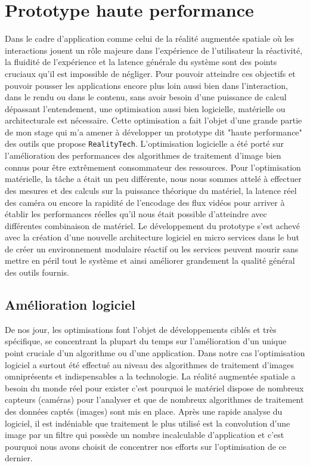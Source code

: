 \chapter{Prototype haute performance}
\label{chap:protoHP}

Dans le cadre d'application comme celui de la réalité augmentée spatiale où les interactions jouent un rôle majeure dans l'expérience de l'utilisateur la réactivité, la fluidité de l'expérience et la latence générale du système sont des points cruciaux qu'il est impossible de négliger. Pour pouvoir atteindre ces objectifs et pouvoir pousser les applications encore plus loin aussi bien dans l'interaction, dans le rendu ou dans le contenu, sans avoir besoin d'une puissance de calcul dépassant l'entendement, une optimisation aussi bien logicielle, matérielle ou architecturale est nécessaire. Cette optimisation a fait l'objet d'une grande partie de mon stage qui m'a amener à développer un prototype dit "haute performance" des outils que propose \texttt{RealityTech}. L'optimisation logicielle a été porté sur l'amélioration des performances des algorithmes de traitement d'image bien connus pour être extrêmement consommateur des ressources. Pour l'optimisation matérielle, la tâche a était un peu différente, nous nous sommes attelé à effectuer des mesures et des calculs sur la puissance théorique du matériel, la latence réel des caméra ou encore la rapidité de l'encodage des flux vidéos pour arriver à établir les performances réelles qu'il nous était possible d'atteindre avec différentes combinaison de matériel. Le développement du prototype s'est achevé avec la création d'une nouvelle architecture logiciel en micro services\cite{dmitry2014micro} dans le but de créer un environnement modulaire réactif ou les services peuvent mourir sans mettre en péril tout le système et ainsi améliorer grandement la qualité général des outils fournis.

\section{Amélioration logiciel}
\label{sec:hpsoft}
De nos jour, les optimisations font l'objet de développements ciblés et très spécifique, se concentrant la plupart du temps sur l'amélioration d'un unique point cruciale d'un algorithme ou d'une application. Dans notre cas l'optimisation logiciel a surtout été effectué au niveau des algorithmes de traitement d'images omniprésents et indispensables a la technologie. La réalité augmentée spatiale a besoin du monde réel pour exister c'est pourquoi le matériel dispose de nombreux capteurs (caméras) pour l'analyser et que de nombreux algorithmes de traitement des données captés (images) sont mis en place. Après une rapide analyse du logiciel, il est indéniable que traitement le plus utilisé est la convolution d'une image par un filtre qui possède un nombre incalculable d'application et c'est pourquoi nous avons choisit de concentrer nos efforts sur l'optimisation de ce dernier.

